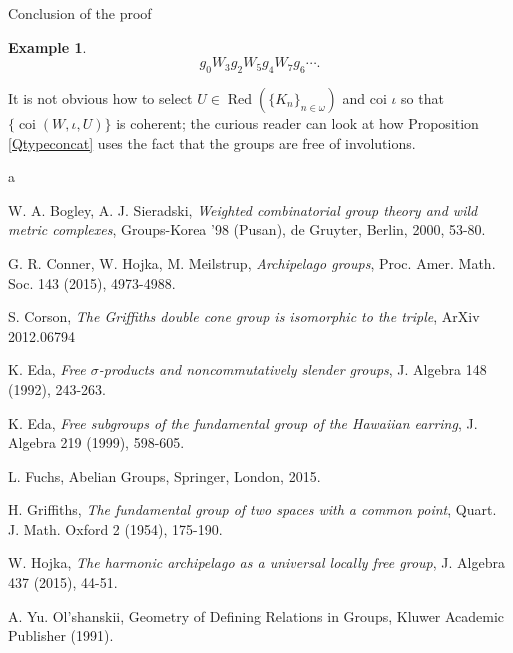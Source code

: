 \documentclass{amsart}
\theoremstyle{definition}\newtheorem{theorem}{Theorem}
\theoremstyle{definition}\newtheorem*{A}{Main Theorem}
\theoremstyle{definition}\newtheorem*{B}{Theorem \ref{elementaryequiv}}
\theoremstyle{definition}\newtheorem*{C}{Theorem \ref{continuous}}
\theoremstyle{definition}\newtheorem*{D}{Theorem \ref{bigisomorphism2}}
\theoremstyle{definition}\newtheorem{bigtheorem}{Main Theorem}
\numberwithin{theorem}{section}
\theoremstyle{definition}\newtheorem{corollary}[theorem]{Corollary}
\theoremstyle{definition}\newtheorem{proposition}[theorem]{Proposition}
\theoremstyle{definition}\newtheorem{definition}[theorem]{Definition}
\theoremstyle{definition}\newtheorem{question}[theorem]{Question}
\theoremstyle{definition}\newtheorem{example}[theorem]{Example}
\theoremstyle{definition}\newtheorem{remark}[theorem]{Remark}
\theoremstyle{definition}\newtheorem{note}[theorem]{Note}
\theoremstyle{definition}\newtheorem{lemma}[theorem]{Lemma}
\theoremstyle{definition}\newtheorem{fact}[theorem]{Fact}
\theoremstyle{definition}\newtheorem{define}[theorem]{Definition}
\theoremstyle{definition}\newtheorem{claim}[theorem]{Claim}
\theoremstyle{definition}\newtheorem{obs}[theorem]{Observation}
\theoremstyle{definition}\newtheorem{definitions}[theorem]{Definitions}
\newcommand{\Red}{\operatorname{Red}}
\newcommand{\coi}{\operatorname{coi}}
\begin{document}
\begin{section}{Conclusion of the proof}
\begin{example}
$$g_0W_3g_2W_5g_4W_7g_6 \cdots.$$

\noindent  It is not obvious how to select $U \in \Red(\{K_n\}_{n \in \omega})$ and coi $\iota$ so that $\{\coi(W, \iota, U)\}$ is coherent; the curious reader can look at how Proposition \ref{Qtypeconcat} uses the fact that the groups are free of involutions.

\end{example}


\end{section}









\begin{thebibliography}{a}

 W. A. Bogley, A. J. Sieradski, \emph{Weighted combinatorial group theory and wild metric complexes}, Groups-Korea '98 (Pusan), de Gruyter, Berlin, 2000, 53-80.

 G. R. Conner, W. Hojka, M. Meilstrup, \emph{Archipelago groups}, Proc. Amer. Math. Soc. 143 (2015), 4973-4988.

 S. Corson, \emph{The Griffiths double cone group is isomorphic to the triple}, ArXiv 2012.06794

 K. Eda,  \emph{Free $\sigma$-products and noncommutatively slender groups}, J. Algebra 148 (1992), 243-263.

 K. Eda, \emph{Free subgroups of the fundamental group of the Hawaiian earring}, J. Algebra 219 (1999), 598-605.

 L. Fuchs, Abelian Groups, Springer, London, 2015.

 H. Griffiths, \emph{The fundamental group of two spaces with a common point}, Quart. J. Math. Oxford 2 (1954), 175-190.



 W. Hojka, \emph{The harmonic archipelago as a universal locally free group}, J. Algebra 437 (2015), 44-51.


 A. Yu. Ol'shanskii, Geometry of Defining Relations in Groups, Kluwer Academic Publisher (1991).


\end{thebibliography}
\end{document}
